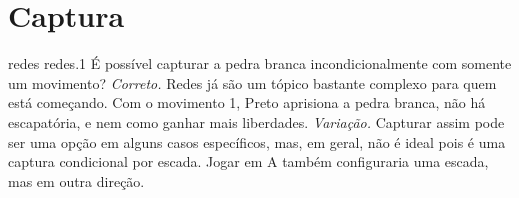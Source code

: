 \chapter{Captura}

\emptypage

\problemAnswerDiagram
  {redes}
  {redes.1}
  {É possível capturar a pedra branca incondicionalmente com somente um movimento?}
  {\emph{Correto.} Redes já são um tópico bastante complexo para quem está começando. Com o movimento {\selectfont \footnotesize{1}}, Preto aprisiona a pedra branca, não há escapatória, e nem como ganhar mais liberdades.}
  {\emph{Variação.} Capturar assim pode ser uma opção em alguns casos específicos, mas, em geral, não é ideal pois é uma captura condicional por escada. Jogar em A também configuraria uma escada, mas em outra direção.}
